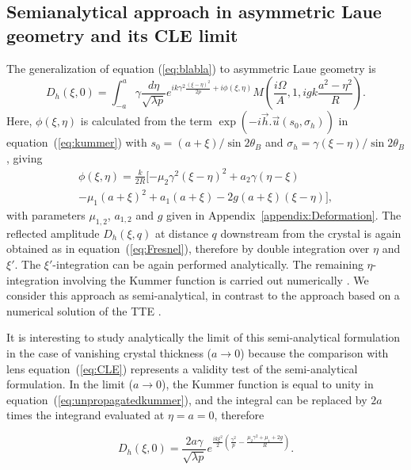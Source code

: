 \documentclass[preprint]{iucr}              %
\begin{document}
\subsection{Semianalytical approach in asymmetric Laue geometry and its CLE limit}
\label{sec:LaueCompatibilityCLE}

The generalization of equation (\ref{eq:blabla}) to asymmetric Laue geometry is \cite{GuigayFerrero2016}
\begin{equation}
\label{eq:unpropagatedkummer}
    D_h(\xi,0) = 
    \int_{-a}^{a} \gamma\frac{d\eta}{\sqrt{\lambda p}}
    e^{i k \gamma^2
    \frac{(\xi-\eta)^2}{2p}+i \phi(\xi,\eta)
    }
     M(\frac{i\Omega}{A},1,i g k \frac{a^2-\eta^2}{R}).
\end{equation}
Here, $\phi(\xi,\eta)$ is calculated from the term $\exp(-i\vec h . \vec u(s_0,\sigma_h))$ in equation~(\ref{eq:kummer}) with $s_0=(a+\xi)/\sin2\theta_B$ and $\sigma_h=\gamma(\xi-\eta)/\sin2\theta_B$, giving
\begin{multline}
    \phi(\xi,\eta) =\frac{k}{2R}[-\mu_2\gamma^2(\xi-\eta)^2
    +a_2\gamma(\eta-\xi) \\
    -\mu_1(a+\xi)^2 
    +a_1(a+\xi)
    -2g(a+\xi)(\xi-\eta)],
\end{multline}
with parameters $\mu_{1,2}$, $a_{1,2}$ and $g$ given in Appendix~\ref{appendix:Deformation}.
The reflected amplitude $D_h(\xi,q)$ at distance $q$ downstream from the crystal is again obtained as in equation~(\ref{eq:Fresnel}), therefore by double integration over $\eta$ and $\xi'$. The $\xi'$-integration can be again performed analytically. The remaining $\eta$-integration involving the Kummer function is carried out numerically \cite{GuigayFerrero2016}. We consider this approach as semi-analytical, in contrast to the approach based on a numerical solution of the TTE \cite{Nesterets}.

It is interesting to study analytically the limit of this semi-analytical formulation in the case of
vanishing crystal thickness ($a\rightarrow0{}$) because the comparison with lens equation~(\ref{eq:CLE}) represents a validity test of the semi-analytical formulation. 
In the limit ($a\rightarrow0{}$),
the Kummer function is equal to unity in equation~(\ref{eq:unpropagatedkummer}), and the integral can be replaced by $2a$ times the integrand evaluated at $\eta=a=0$, therefore


\begin{equation}
\label{eq:14reduced}
    D_h(\xi,0) = \frac{2 a \gamma}{\sqrt{\lambda p}} e^{\frac{i k \xi^2}{2}(\frac{\gamma^2}{p}-\frac{\mu_2\gamma^2+\mu_1+2g}{R})}.
\end{equation}
\end{document}

